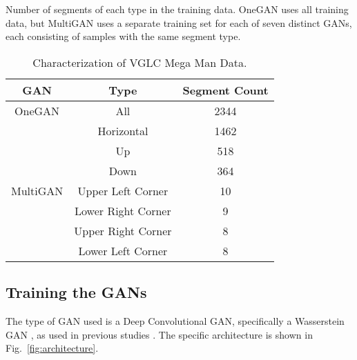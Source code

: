 
\begin{table}[t]
\caption{\label{tab:GANs}Characterization of VGLC Mega Man Data.}
{\small Number of segments of each type in the training data. OneGAN
 uses all training data, but MultiGAN uses a separate training set for each of seven distinct GANs, each consisting of samples with the same segment type.}

\centering
\begin{tabular}{|c|c|c|}
\hline
GAN & Type & Segment Count \\ 
\hline %
OneGAN & All & 2344 \\
\hline
\multirow{7}{*}{MultiGAN} & Horizontal & 1462 \\
\cline{2-3}
& Up & 518  \\
\cline{2-3}
& Down & 364 \\
\cline{2-3}
& Upper Left Corner & 10   \\
\cline{2-3}
& Lower Right Corner & 9  \\
\cline{2-3}
& Upper Right Corner & 8 \\
\cline{2-3}
& Lower Left Corner & 8 \\
\hline
\end{tabular}
\end{table}

\subsection{Training the GANs}

The type of GAN used is a Deep Convolutional GAN, specifically a Wasserstein GAN \cite{arjovsky2017wasserstein}, as used in previous studies \cite{volz:gecco2018,gutierrez2020zeldagan,schrum:gecco2020cppn2gan}. 
The specific architecture is shown in Fig.~\ref{fig:architecture}.

